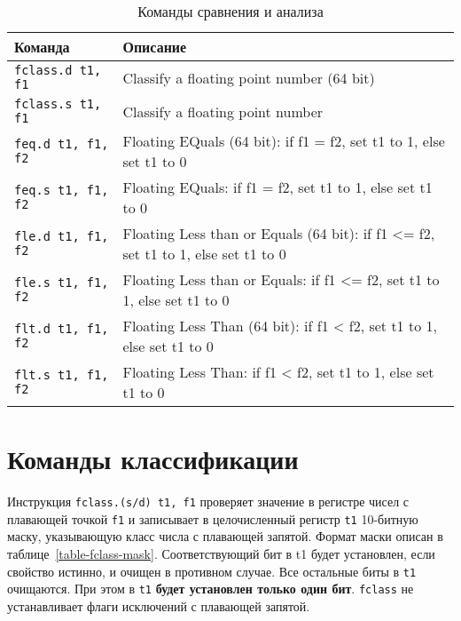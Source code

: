 \begin{table}[h]
    \caption{Команды сравнения и анализа}
    \centering
    \begin{tabularx}{\textwidth}{|l|X|}
        \hline
        \textbf{Команда} & \textbf{Описание} \\
        \hline \verb|fclass.d t1, f1| & Classify a floating point number (64 bit) \\
        \hline \verb|fclass.s t1, f1| & Classify a floating point number \\
        \hline \verb|feq.d t1, f1, f2| & Floating EQuals (64 bit): if f1 = f2, set t1 to 1, else set t1 to 0 \\
        \hline \verb|feq.s t1, f1, f2| & Floating EQuals: if f1 = f2, set t1 to 1, else set t1 to 0 \\
        \hline \verb|fle.d t1, f1, f2| & Floating Less than or Equals (64 bit): if f1 <= f2, set t1 to 1, else set t1 to 0 \\
        \hline \verb|fle.s t1, f1, f2| & Floating Less than or Equals: if f1 <= f2, set t1 to 1, else set t1 to 0 \\
        \hline \verb|flt.d t1, f1, f2| & Floating Less Than (64 bit): if f1 < f2, set t1 to 1, else set t1 to 0 \\
        \hline \verb|flt.s t1, f1, f2| & Floating Less Than: if f1 < f2, set t1 to 1, else set t1 to 0 \\
        \hline
    \end{tabularx}
    \label{table-fp-processor-cmp}
\end{table}

\section{Команды классификации}

Инструкция \verb|fclass.(s/d) t1, f1| проверяет значение в регистре чисел с плавающей точкой \verb|f1| и записывает в целочисленный регистр \verb|t1| 10-битную маску, указывающую класс числа с плавающей запятой. Формат маски описан в таблице~\ref{table-fclass-mask}. Соответствующий бит в t1 будет установлен, если свойство истинно, и очищен в противном случае. Все остальные биты в \verb|t1| очищаются. При этом в \verb|t1| \textbf{будет установлен только один бит}. \verb|fclass| не устанавливает флаги исключений с плавающей запятой.

